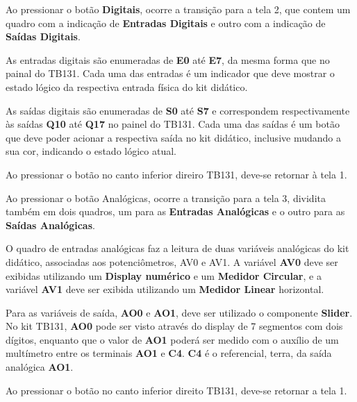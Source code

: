 Ao pressionar o botão \textbf{Digitais}, ocorre a transição para a tela 2, que contem um quadro com a indicação de \textbf{Entradas Digitais} e outro com a indicação de \textbf{Saídas Digitais}.

As entradas digitais são enumeradas de \textbf{E0} até \textbf{E7}, da mesma forma que no painal do TB131. 
Cada uma das entradas é um indicador que deve mostrar o estado lógico da respectiva entrada física do kit didático.

As saídas digitais são enumeradas de \textbf{S0} até \textbf{S7} e correspondem respectivamente às saídas \textbf{Q10} até \textbf{Q17} no painel do TB131. 
Cada uma das saídas é um botão que deve poder acionar a respectiva saída no kit didático, inclusive mudando a sua cor, indicando o estado lógico atual. 

Ao pressionar o botão no canto inferior direiro TB131, deve-se retornar à tela 1.

Ao pressionar o botão Analógicas, ocorre a transição para a tela 3, dividita também em dois quadros, um para as \textbf{Entradas Analógicas} e o outro para as \textbf{Saídas Analógicas}.

O quadro de entradas analógicas faz a leitura de duas variáveis analógicas do kit didático, associadas aos potenciômetros, AV0 e AV1. 
A variável \textbf{AV0} deve ser exibidas utilizando um \textbf{Display numérico} e um \textbf{Medidor Circular}, e a variável \textbf{AV1} deve ser exibida utilizando um \textbf{Medidor Linear} horizontal. 

Para as variáveis de saída, \textbf{AO0} e \textbf{AO1}, deve ser utilizado o componente \textbf{Slider}. 
No kit TB131, \textbf{AO0} pode ser visto através do display de 7 segmentos com dois dígitos, enquanto que o valor de \textbf{AO1} poderá ser medido com o auxílio de um multímetro entre os terminais \textbf{AO1} e \textbf{C4}. \textbf{C4} é o referencial, terra, da saída analógica \textbf{AO1}. 

Ao pressionar o botão no canto inferior direito TB131, deve-se retornar a tela 1.



